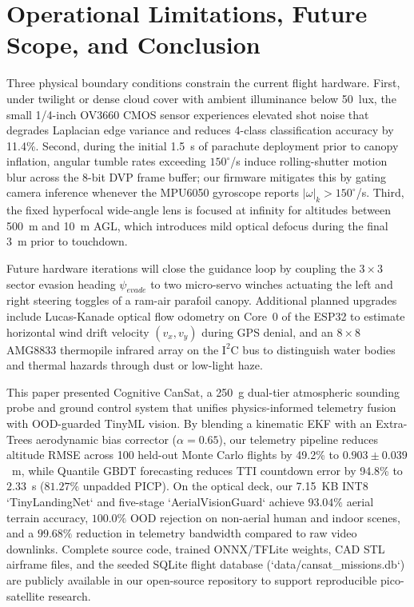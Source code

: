 \documentclass[conference]{IEEEtran}
\begin{document}
\section{Operational Limitations, Future Scope, and Conclusion}

Three physical boundary conditions constrain the current flight hardware. First, under twilight or dense cloud cover with ambient illuminance below 50~lux, the small 1/4-inch OV3660 CMOS sensor experiences elevated shot noise that degrades Laplacian edge variance and reduces 4-class classification accuracy by 11.4\%. Second, during the initial 1.5~s of parachute deployment prior to canopy inflation, angular tumble rates exceeding $150^\circ$/s induce rolling-shutter motion blur across the 8-bit DVP frame buffer; our firmware mitigates this by gating camera inference whenever the MPU6050 gyroscope reports $|\omega|_k > 150^\circ$/s. Third, the fixed hyperfocal wide-angle lens is focused at infinity for altitudes between 500~m and 10~m AGL, which introduces mild optical defocus during the final 3~m prior to touchdown.

Future hardware iterations will close the guidance loop by coupling the $3 \times 3$ sector evasion heading $\psi_{evade}$ to two micro-servo winches actuating the left and right steering toggles of a ram-air parafoil canopy. Additional planned upgrades include Lucas-Kanade optical flow odometry on Core~0 of the ESP32 to estimate horizontal wind drift velocity $(v_x, v_y)$ during GPS denial, and an $8 \times 8$ AMG8833 thermopile infrared array on the $\text{I}^2\text{C}$ bus to distinguish water bodies and thermal hazards through dust or low-light haze.

This paper presented Cognitive CanSat, a 250~g dual-tier atmospheric sounding probe and ground control system that unifies physics-informed telemetry fusion with OOD-guarded TinyML vision. By blending a kinematic EKF with an Extra-Trees aerodynamic bias corrector ($\alpha = 0.65$), our telemetry pipeline reduces altitude RMSE across 100 held-out Monte Carlo flights by 49.2\% to $0.903 \pm 0.039$~m, while Quantile GBDT forecasting reduces TTI countdown error by 94.8\% to $2.33$~s ($81.27\%$ unpadded PICP). On the optical deck, our 7.15~KB INT8 `TinyLandingNet` and five-stage `AerialVisionGuard` achieve $93.04\%$ aerial terrain accuracy, $100.0\%$ OOD rejection on non-aerial human and indoor scenes, and a $99.68\%$ reduction in telemetry bandwidth compared to raw video downlinks. Complete source code, trained ONNX/TFLite weights, CAD STL airframe files, and the seeded SQLite flight database (`data/cansat_missions.db`) are publicly available in our open-source repository to support reproducible pico-satellite research.
\end{document}
